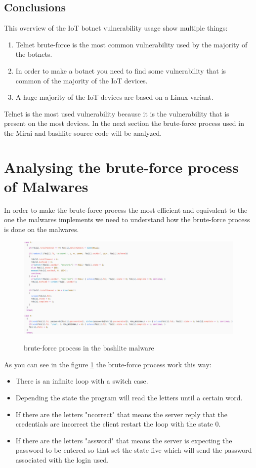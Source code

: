 \documentclass{report}
\begin{document}
\subsection{Conclusions}
This overview of the IoT botnet vulnerability usage show multiple things:
\begin{enumerate}
 \item Telnet brute-force is the most common vulnerability used by the majority of the botnets.
 \item In order to make a botnet you need to find some vulnerability that is common of the majority of the IoT devices.
 \item A huge majority of the IoT devices are based on a Linux variant.
\end{enumerate}
Telnet is the most used vulnerability because it is the vulnerability that is present on the most devices. In the next section the brute-force process used in the Mirai and bashlite source code will be analyzed.

\section{Analysing the brute-force process of Malwares}
In order to make the brute-force process the most efficient and equivalent to the one the malwares implements we need to understand how the brute-force process is done on the malwares.
\begin{figure}
 \caption{brute-force process in the bashlite malware}
 \includegraphics[width=1.2\textwidth]{./img/bashlite-bruteforce}
 \label{fig:bashlite-brute}
\end{figure}
As you can see in the figure \ref{fig:bashlite-brute} the brute-force process work this way:
\begin{itemize}
\item There is an infinite loop with a switch case.

\item Depending the state the program will read the letters until a certain word.

\item If there are the letters "ncorrect" that means the server reply that the credentials are incorrect the client restart the loop with the state 0.

\item If there are the letters "assword" that means the server is expecting the password to be entered so that set the state five which will send the password associated with the login used.
\end{itemize}
\end{document}

